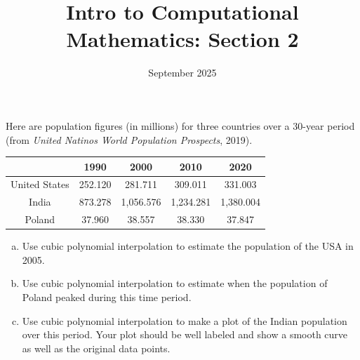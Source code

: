 \documentclass{article}
\title{Intro to Computational Mathematics: Section 2}
\date{September 2025}
\newenvironment{problem}[2][Problem]{\begin{trivlist}
\item[\hskip \labelsep {\bfseries #1}\hskip \labelsep {\bfseries #2.}]}{\end{trivlist}}
\theoremstyle{definition}
\begin{document}
\maketitle



\begin{problem}{2.1.3}
    Here are population figures (in millions) for three countries over a 30-year period (from \textit{United Natinos World Population Prospects}, 2019).
    \begin{center}
    \begin{tabular}{ccccc}
        & \textbf{1990} & \textbf{2000} & \textbf{2010} & \textbf{2020} \\\hline
        United States & 252.120 & 281.711 & 309.011 & 331.003 \\\hline
        India & 873.278 & 1,056.576 & 1,234.281 & 1,380.004 \\\hline
        Poland & 37.960 & 38.557 & 38.330 & 37.847
    \end{tabular}
    \end{center}
    \begin{enumerate}[(a)]
        \item Use cubic polynomial interpolation to estimate the population of the USA in 2005.
        \item Use cubic polynomial interpolation to estimate when the population of Poland peaked during this time period.
        \item Use cubic polynomial interpolation to make a plot of the Indian population over this period. Your plot should be well labeled and show a smooth curve as well as the original data points.
    \end{enumerate}
\end{problem}
\end{document}
